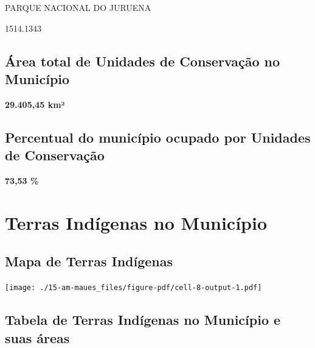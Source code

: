 \documentclass[
  letterpaper,
]{report}
\begin{document}
\n    

\n    

\n      

PARQUE NACIONAL DO JURUENA

\n      

1514.1343

\n    

\n  

\n

\hypertarget{uxe1rea-total-de-unidades-de-conservauxe7uxe3o-no-municuxedpio}{%
\subsection{Área total de Unidades de Conservação no
Município}\label{uxe1rea-total-de-unidades-de-conservauxe7uxe3o-no-municuxedpio}}

\textbf{29.405,45 km²}

\hypertarget{percentual-do-municuxedpio-ocupado-por-unidades-de-conservauxe7uxe3o}{%
\subsection{Percentual do município ocupado por Unidades de
Conservação}\label{percentual-do-municuxedpio-ocupado-por-unidades-de-conservauxe7uxe3o}}

\textbf{73,53 \%}

\hypertarget{terras-induxedgenas-no-municuxedpio}{%
\section{Terras Indígenas no
Município}\label{terras-induxedgenas-no-municuxedpio}}

\hypertarget{mapa-de-terras-induxedgenas}{%
\subsection{Mapa de Terras
Indígenas}\label{mapa-de-terras-induxedgenas}}

\texttt{[image: ./15-am-maues\_files/figure-pdf/cell-8-output-1.pdf]}

\hypertarget{tabela-de-terras-induxedgenas-no-municuxedpio-e-suas-uxe1reas}{%
\subsection{Tabela de Terras Indígenas no Município e suas
áreas}\label{tabela-de-terras-induxedgenas-no-municuxedpio-e-suas-uxe1reas}}
\end{document}
